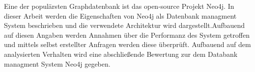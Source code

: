 Eine der populärsten Graphdatenbank ist das open-source Projekt Neo4j\parencite{francis2018cypher}. In dieser Arbeit werden die Eigenschaften von Neo4j als Datenbank managment System beschrieben und die verwendete Architektur wird dargestellt.Aufbauend auf diesen Angaben werden Annahmen über die Performanz des System getroffen und mittels selbst erstellter Anfragen werden diese überprüft. Aufbauend auf dem analysierten Verhalten wird eine abschließende Bewertung zur dem Databank managment System Neo4j gegeben. 

